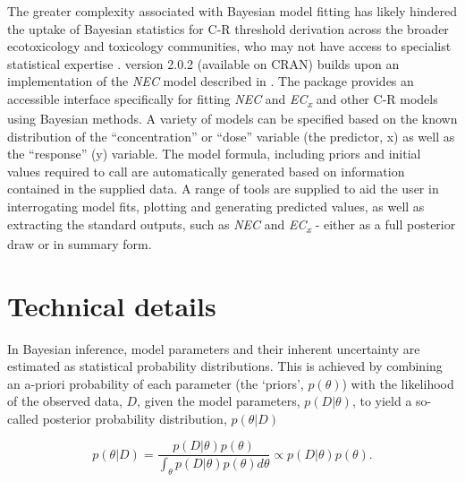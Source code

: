 The greater complexity associated with Bayesian model fitting has likely
hindered the uptake of Bayesian statistics for C-R threshold derivation
across the broader ecotoxicology and toxicology communities, who may not
have access to specialist statistical expertise \citep{Fisher2019}.
 version 2.0.2 (available on CRAN) builds upon an
implementation of the \emph{NEC} model described in
\citep{Fox2010, Pires2002}. The  package provides an
accessible interface specifically for fitting \emph{NEC} and
\emph{EC\textsubscript{x}} and other C-R models using Bayesian methods.
A variety of models can be specified based on the known distribution of
the ``concentration'' or ``dose'' variable (the predictor, x) as well as
the ``response'' (y) variable. The model formula, including priors and
initial values required to call  are automatically generated
based on information contained in the supplied data. A range of tools
are supplied to aid the user in interrogating model fits, plotting and
generating predicted values, as well as extracting the standard outputs,
such as \emph{NEC} and \emph{EC\textsubscript{x}} - either as a full
posterior draw or in summary form.

\hypertarget{technical-details}{%
\section{Technical details}\label{technical-details}}

In Bayesian inference, model parameters and their inherent uncertainty
are estimated as statistical probability distributions. This is achieved
by combining an a-priori probability of each parameter (the `priors',
\(p(\theta)\)) with the likelihood of the observed data, \(D\), given
the model parameters, \(p(D | \theta)\), to yield a so-called posterior
probability distribution, \(p(\theta | D)\)

\begin{equation}
  p(\theta | D) = \frac{p(D | \theta) p(\theta)}{\int_{\theta} p(D | \theta) p(\theta) d \theta} \propto p(D | \theta) p(\theta).
  \label{eqn1}
\end{equation}

